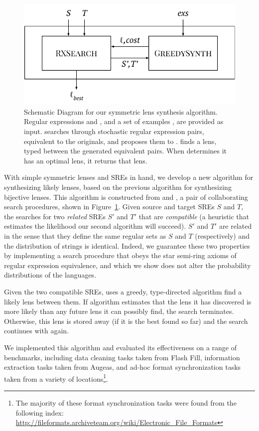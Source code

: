 \documentclass[acmsmall,screen,anonymous]{acmart}
\begin{document}
\begin{figure}
  \includegraphics[width=.5\textwidth]{high-level-algorithm.pdf}
  \caption{Schematic Diagram for our symmetric lens synthesis algorithm. Regular
    expressions \Regex and \RegexAlt, and a set of examples \Examples, are
    provided as input. \RXSearch searches through stochastic regular expression
    pairs, equivalent to the originals, and proposes them to \GreedySynth.
    \GreedySynth finds a lens, typed between the generated equivalent pairs.
    When \RXSearch determines it has an optimal lens, it returns that lens.}
  \label{fig:high-level-algorithm}
\end{figure}

With simple symmetric lenses and SREs in hand, we develop a new algorithm for
synthesizing likely lenses, based on the previous algorithm for synthesizing
bijective lenses. This algorithm is constructed from \RXSearch and \GreedySynth,
a pair of collaborating search procedures, shown in
Figure~\ref{fig:high-level-algorithm}. Given source and target SREs $S$ and $T$,
the \RXSearch searches for two \emph{related} SREs $S'$ and $T'$ that are
\emph{compatible} (a heuristic that estimates the likelihood our second
algorithm will succeed). $S'$ and $T'$ are related in the sense that they define
the same regular sets as $S$ and $T$ (respectively) and the distribution of
strings is identical. Indeed, we guarantee these two properties by implementing
a search procedure that obeys the star semi-ring axioms of regular expression
equivalence, and which we show does not alter the probability distributions of
the languages.

Given the two compatible SREs, \GreedySynth uses a greedy, type-directed
algorithm find a likely lens between them. If algorithm estimates that the lens
it has discovered is more likely than any future lens it can possibly find, the
search terminates. Otherwise, this lens is stored away (if it is the best found
so far) and the search continues with \RXSearch again.

We implemented this algorithm and evaluated its effectiveness on a
range of benchmarks, including data cleaning tasks taken from Flash Fill,
information extraction tasks taken from Augeas, and ad-hoc format
synchronization tasks taken from a variety of locations\footnote{The majority of
  these format synchronization tasks were found from the following index:
  \url{http://fileformats.archiveteam.org/wiki/Electronic_File_Formats}}.
\end{document}
